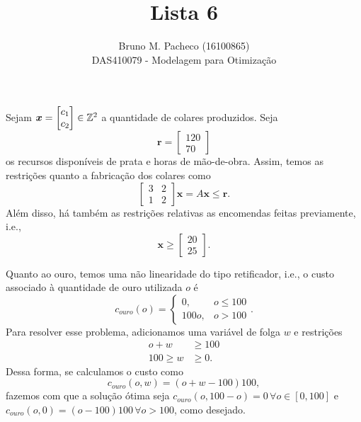 \documentclass[a4paper]{report}
\begin{document}
 
\title{Lista 6}
\author{Bruno M. Pacheco (16100865)\\
DAS410079 - Modelagem para Otimização}
 
\maketitle
 

Sejam $\bm{x} = \begin{bmatrix} c_1 \\ c_2 \end{bmatrix}  \in \mathbb{Z}^2$ a quantidade de colares produzidos. Seja \[
\bm{r} = \begin{bmatrix} 120 \\ 70 \end{bmatrix} 
\] os recursos disponíveis de prata e horas de mão-de-obra. Assim, temos as restrições quanto a fabricação dos colares como \[
\begin{bmatrix}
    3 & 2 \\
    1 & 2
\end{bmatrix}\bm{x} = A \bm{x} \le \bm{r}
.\] Além disso, há também as restrições relativas as encomendas feitas previamente, i.e., \[
\bm{x} \ge \begin{bmatrix} 20 \\ 25 \end{bmatrix} 
.\] 

Quanto ao ouro, temos uma não linearidade do tipo retificador, i.e., o custo associado à quantidade de ouro utilizada $o$ é \[
c_{ouro}\left( o \right) = \begin{cases}
    0, & o \le 100 \\
    100 o, & o > 100
\end{cases}
.\] Para resolver esse problema, adicionamos uma variável de folga $w$ e restrições
\begin{align*}
    o + w &\ge 100 \\
    100 \ge w &\ge 0
.\end{align*}
Dessa forma, se calculamos o custo como \[
c_{ouro}\left( o, w \right) = \left( o+w -100\right) 100
,\] fazemos com que a solução ótima seja $c_{ouro}\left( o,100-o \right) = 0\, \forall o \in \left[ 0,100 \right] $ e $c_{ouro}\left( o,0 \right) = \left( o-100 \right) 100\, \forall o>100$, como desejado.
\end{document}
